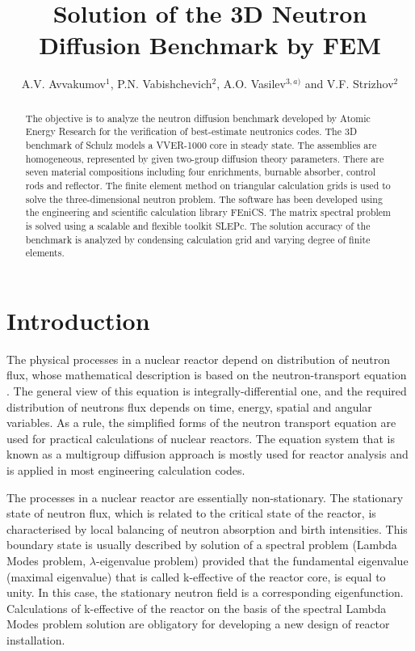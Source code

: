 \documentclass[runningheads,a4paper]{llncs}
\title{Solution of the 3D Neutron Diffusion Benchmark by FEM}
\author{A.V. Avvakumov$^{1}$, P.N. Vabishchevich$^{2}$, A.O. Vasilev$^{3,a)}$ and V.F. Strizhov$^{2}$}
\institute{$^1$National Research Center \emph{Kurchatov Institute}, Moscow, Russia \\
$^2$Nuclear Safety Institute of RAS,  Moscow, Russia \\
$^3$North-Eastern Federal University, Yakutsk, Russia\\
$^{a)}$Corresponding author: \url{haska87@gmail.com}}
\newcommand{\keywords}[1]{\par\addvspace\baselineskip
\noindent\keywordname\enspace\ignorespaces#1}
\begin{document}
\maketitle

\begin{abstract}
The objective is to analyze the neutron diffusion benchmark developed by Atomic Energy Research for the verification of best-estimate neutronics codes. The 3D benchmark of Schulz models a VVER-1000 core in steady state. The assemblies are homogeneous, represented by given two-group diffusion theory parameters. There are seven material compositions including four enrichments, burnable absorber, control rods and reflector. The finite element method on triangular calculation grids is used to solve the three-dimensional neutron problem. The software has been developed using the engineering and scientific calculation library FEniCS. The matrix spectral problem is solved using a scalable and flexible toolkit SLEPc. The solution accuracy of the benchmark is analyzed by condensing calculation grid and varying degree of finite elements.
\end{abstract}



\section{Introduction}
The physical processes in a nuclear reactor \cite{duderstadt1976nuclear}
depend on distribution of neutron flux, whose mathematical description is based on the neutron-transport equation \cite{hetrick1971dynamics,stacey2007}. 
The general view of this equation is integrally-differential one, and the required distribution of neutrons flux depends on time, energy, spatial and angular variables. As a rule, the simplified forms of the neutron transport equation are used for practical calculations of nuclear reactors. The equation system that is known as a multigroup diffusion approach is mostly used for reactor analysis \cite{marchuk1986numerical,lewis1993computational} and is applied in most engineering calculation codes.

The processes in a nuclear reactor are essentially non-stationary. The stationary state of neutron flux, which is related to the critical state of the reactor, is characterised by local balancing of neutron absorption and birth intensities. This boundary state is usually described by solution of a spectral problem (Lambda Modes problem, $\lambda$-eigenvalue problem) provided that the fundamental eigenvalue (maximal eigenvalue) that is called k-effective of the reactor core, is equal to unity. In this case, the stationary neutron field is a corresponding eigenfunction. Calculations of k-effective of the reactor on the basis of the spectral Lambda Modes problem solution are obligatory for developing a new design of reactor installation.
\end{document}
